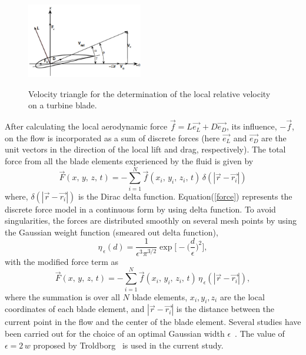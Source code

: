 \begin{figure}
\centering
\includegraphics[width=0.45\textwidth]{Figure/triangle.png}\\
 \caption[Velocity triangle on a wind turbine blade]{Velocity triangle for the determination of the local relative velocity on a turbine blade.}
 \label{f:triangle}
\end{figure}
After calculating the local aerodynamic force $\vec{f}= L\vec{e_L}+D\vec{e_D}$, its influence, $-\vec{f}$, on the flow is incorporated as a sum of discrete forces (here $\vec{e_L}$ and $\vec{e_D}$ are the unit vectors in the direction of the local lift and drag, respectively). The total force from all the blade elements experienced by the fluid is given by
\begin{equation}
\vec{F}(x,\,y,\,z,\,t)=-\sum_{i=1}^{N}\vec{f}(x_i,\,y_i,\,z_i,\,t)\,\delta(|\vec {r}-\vec{r_i}|) \label{force}
\end{equation}
where, $\delta(|\vec {r}-\vec{r_i}|)$ is the Dirac delta function. Equation(\ref{force}) represents the discrete force model in a continuous form by using delta function. To avoid  singularities, the forces are distributed smoothly on several mesh points by using the Gaussian weight function (smeared out delta function),
\begin{equation}
\eta_{\,\epsilon}(d)=\frac{1}{\epsilon^3\pi^{3/2}}\exp\big[-\big(\frac{d}{\epsilon}\big)^2\big],
\end{equation}
with the modified force term as
\begin{equation}
\vec{F}(x,\,y,\,z,\,t)=-\sum_{i=1}^{N}\vec{f}(x_i,\,y_i,\,z_i,\,t)\,\eta_{\,\epsilon}(|\vec {r}-\vec{r_i}|),
\end{equation}
where the summation is over all $N$ blade elements, $x_i,y_i,z_i$ are the local coordinates of each blade element, and $|\vec {r}-\vec{r_i}|$ is the distance between the current point in the flow and the center of the blade element. Several studies have been carried out for the choice of an optimal Gaussian width $\epsilon$~\cite{troldborg, martinez}. The value of $\epsilon=2\,w$ proposed by Troldborg~\cite{troldborg} is used in the current study.




